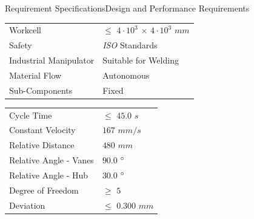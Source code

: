 \begin{frame}{Requirement Specifications}{Design and Performance Requirements}
    \centering

    \begin{tabular}{m{3.475cm}m{3.175cm}}
    \hline \rowcolor{table_first_row} \multicolumn{2}{c}{\cellcolor{beamer@normaltextcolor} {\color{white} Design Requirements}} \\ \hline
    Workcell &  $\leq$ $4\cdot10^{3}$ $\times$ $4\cdot10^{3}$ $mm$ \\
    \rowcolor{beamer@barcolor} Safety & \textit{ISO} Standards \\
    Industrial Manipulator  & Suitable for Welding\\ 
    \rowcolor{beamer@barcolor} Material Flow &  Autonomous \\
    Sub-Components &  Fixed \\ \hline
    \end{tabular}

\vspace{5mm}

    \begin{tabular}{m{3.475cm}m{3.175cm}} 
    \hline \rowcolor{table_first_row} \multicolumn{2}{c}{\cellcolor{beamer@normaltextcolor} {\color{white} Performance Requirements}} \\ \hline
    Cycle Time &  $\leq$ $45.0$ $s$ \\ 
    \rowcolor{beamer@barcolor} Constant Velocity &  $167$ $mm/s$ \\
    Relative Distance & $480$ $mm$ \\ 
    \rowcolor{beamer@barcolor} Relative Angle - Vanes &$90.0$ $\degree$ \\
    Relative Angle - Hub &  $30.0$ $\degree$ \\ 
    \rowcolor{beamer@barcolor} Degree of Freedom &  $\geq$ $5$ \\
    Deviation & $\leq$ $0.300$ $mm$\\ \hline
    \end{tabular}
    
    
\end{frame}